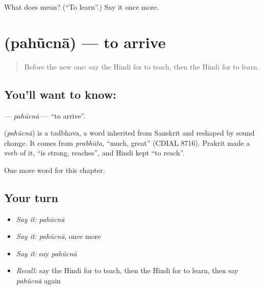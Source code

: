 \begin{tcolorbox}[breakable,colback=teal!4,colframe=teal!35!black,title={Before you move on}]
What does  mean? (\textquotedblleft{}To learn\textquotedblright{}.) Say it once more.
\end{tcolorbox}
\section[\texorpdfstring{\hi{पहुँचना} (pahũcnā)}{पहुँचना (pahũcnā)}]{ (pahũcnā) — to arrive}

\label{lesson:HI-C164-pahucna}



\begin{quote}
Before the new one: say the Hindi for to teach, then the Hindi for to learn.
\end{quote}

\subsection*{You'll want to know: }
\textbf{} — \emph{pahũcnā} — \textquotedblleft{}to arrive\textquotedblright{}.

\begin{cousinweb}
\textbf{} (\emph{pahũcnā}) is a tadbhava, a word inherited from Sanskrit and reshaped by sound change. It comes from \emph{prabhūta}, \textquotedblleft{}much, great\textquotedblright{} (CDIAL 8716). Prakrit made a verb of it, \textquotedblleft{}is strong, reaches\textquotedblright{}, and Hindi kept \textquotedblleft{}to reach\textquotedblright{}.
\end{cousinweb}

\begin{grammarlens}[title={What you've built}]
One more word for this chapter.
\end{grammarlens}

\subsection*{Your turn}
\begin{itemize}
\raggedright
  \item \emph{Say it:} \emph{pahũcnā}
  \item \emph{Say it:} \emph{pahũcnā}, once more
  \item \emph{Say it:} say \emph{pahũcnā}
  \item \emph{Recall:} say the Hindi for to teach, then the Hindi for to learn, then say \emph{pahũcnā} again
\end{itemize}

